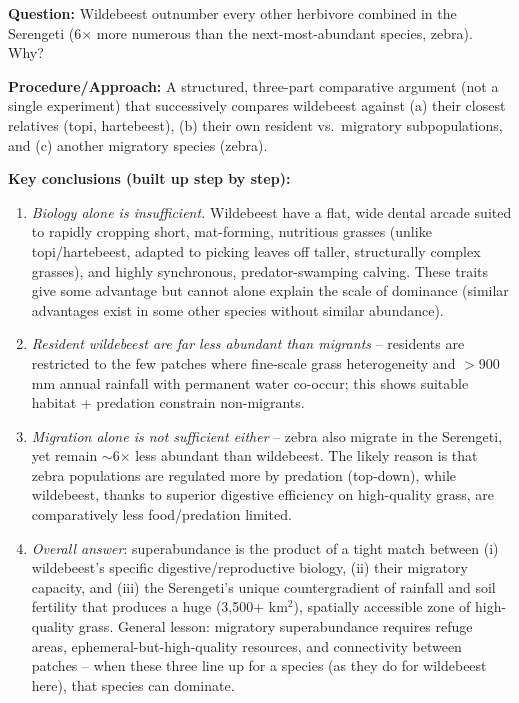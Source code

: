 \documentclass[11pt,a4paper]{article}
\begin{document}
\begin{papbox}[title={Paper Summary: Hopcraft et al. (2015), in \textit{Serengeti IV} -- ``Why Are Wildebeest the Most Abundant Herbivore in the Serengeti Ecosystem?''}]
\textbf{Question:} Wildebeest outnumber every other herbivore combined in the Serengeti (6$\times$ more numerous than the next-most-abundant species, zebra). Why?

\textbf{Procedure/Approach:} A structured, three-part comparative argument (not a single experiment) that successively compares wildebeest against (a) their closest relatives (topi, hartebeest), (b) their own resident vs.\ migratory subpopulations, and (c) another migratory species (zebra).

\textbf{Key conclusions (built up step by step):}
\begin{enumerate}[leftmargin=1.3em,nosep]
\item \emph{Biology alone is insufficient.} Wildebeest have a flat, wide dental arcade suited to rapidly cropping short, mat-forming, nutritious grasses (unlike topi/hartebeest, adapted to picking leaves off taller, structurally complex grasses), and highly synchronous, predator-swamping calving. These traits give some advantage but cannot alone explain the scale of dominance (similar advantages exist in some other species without similar abundance).
\item \emph{Resident wildebeest are far less abundant than migrants} -- residents are restricted to the few patches where fine-scale grass heterogeneity and $>$900 mm annual rainfall with permanent water co-occur; this shows suitable habitat + predation constrain non-migrants.
\item \emph{Migration alone is not sufficient either} -- zebra also migrate in the Serengeti, yet remain $\sim$6$\times$ less abundant than wildebeest. The likely reason is that zebra populations are regulated more by predation (top-down), while wildebeest, thanks to superior digestive efficiency on high-quality grass, are comparatively less food/predation limited.
\item \emph{Overall answer}: superabundance is the product of a tight match between (i) wildebeest's specific digestive/reproductive biology, (ii) their migratory capacity, and (iii) the Serengeti's unique countergradient of rainfall and soil fertility that produces a huge (3,500+ km$^2$), spatially accessible zone of high-quality grass. General lesson: migratory superabundance requires refuge areas, ephemeral-but-high-quality resources, and connectivity between patches -- when these three line up for a species (as they do for wildebeest here), that species can dominate.
\end{enumerate}
\end{papbox}
\end{document}
